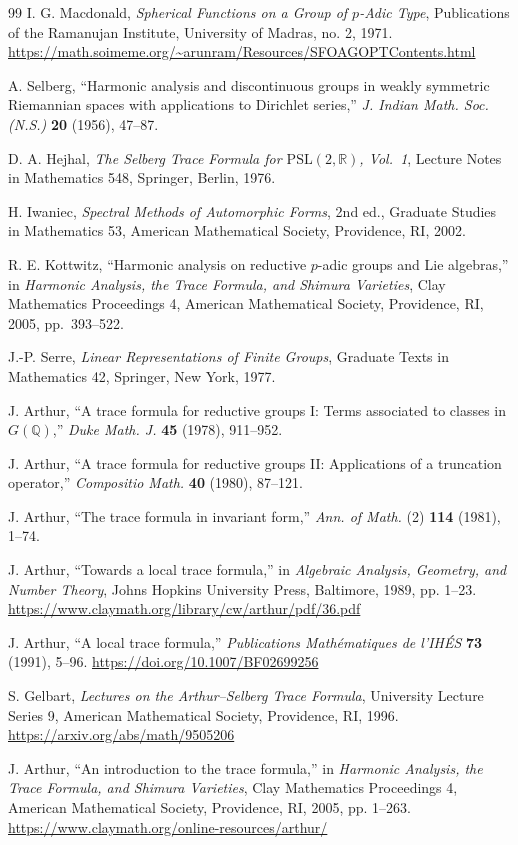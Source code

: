 \documentclass[12pt]{article}
\theoremstyle{remark}
\begin{document}
\begin{thebibliography}{99}
I. G. Macdonald, \emph{Spherical Functions on a Group of
$p$-Adic Type}, Publications of the Ramanujan Institute,
University of Madras, no. 2, 1971.
\url{https://math.soimeme.org/~arunram/Resources/SFOAGOPTContents.html}

A. Selberg, ``Harmonic analysis and discontinuous groups in weakly
symmetric Riemannian spaces with applications to Dirichlet series,''
\emph{J. Indian Math. Soc. (N.S.)} \textbf{20} (1956), 47--87.

D. A. Hejhal, \emph{The Selberg Trace Formula for
$\mathrm{PSL}(2,\mathbb R)$, Vol.~1}, Lecture Notes in Mathematics
548, Springer, Berlin, 1976.

H. Iwaniec, \emph{Spectral Methods of Automorphic Forms}, 2nd ed.,
Graduate Studies in Mathematics 53, American Mathematical Society,
Providence, RI, 2002.

R. E. Kottwitz, ``Harmonic analysis on reductive $p$-adic groups and
Lie algebras,'' in \emph{Harmonic Analysis, the Trace Formula, and
Shimura Varieties}, Clay Mathematics Proceedings 4, American
Mathematical Society, Providence, RI, 2005, pp.~393--522.

J.-P. Serre, \emph{Linear Representations of Finite Groups},
Graduate Texts in Mathematics 42, Springer, New York, 1977.

J. Arthur, ``A trace formula for reductive groups I:
Terms associated to classes in $G(\mathbb Q)$,''
\emph{Duke Math. J.} \textbf{45} (1978), 911--952.

J. Arthur, ``A trace formula for reductive groups II:
Applications of a truncation operator,''
\emph{Compositio Math.} \textbf{40} (1980), 87--121.

J. Arthur, ``The trace formula in invariant form,''
\emph{Ann. of Math.} (2) \textbf{114} (1981), 1--74.

J. Arthur, ``Towards a local trace formula,'' in
\emph{Algebraic Analysis, Geometry, and Number Theory},
Johns Hopkins University Press, Baltimore, 1989, pp. 1--23.
\url{https://www.claymath.org/library/cw/arthur/pdf/36.pdf}

J. Arthur, ``A local trace formula,''
\emph{Publications Math\'ematiques de l'IH\'ES} \textbf{73}
(1991), 5--96. \url{https://doi.org/10.1007/BF02699256}

S. Gelbart, \emph{Lectures on the Arthur--Selberg Trace Formula},
University Lecture Series 9, American Mathematical Society,
Providence, RI, 1996. \url{https://arxiv.org/abs/math/9505206}

J. Arthur, ``An introduction to the trace formula,'' in
\emph{Harmonic Analysis, the Trace Formula, and Shimura Varieties},
Clay Mathematics Proceedings 4, American Mathematical Society,
Providence, RI, 2005, pp. 1--263.
\url{https://www.claymath.org/online-resources/arthur/}
\end{thebibliography}
\end{document}
